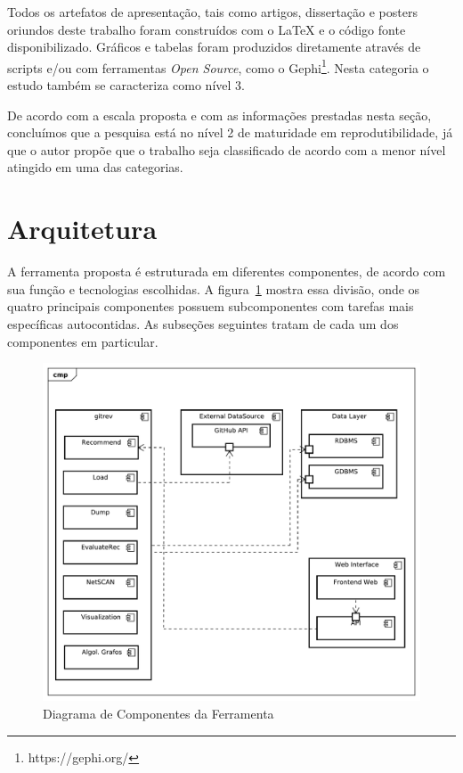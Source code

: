 \documentclass[12pt,openany,oneside,a4paper,english,brazil]{abntbibufjf}
\begin{document}
    Todos os artefatos de apresentação, tais como artigos, dissertação e posters oriundos deste trabalho foram construídos com o \LaTeX \cite{lamport1994} e o código fonte disponibilizado. Gráficos e tabelas foram produzidos diretamente através de scripts e/ou com ferramentas \textit{Open Source}, como o Gephi\footnote{https://gephi.org/}. Nesta categoria o estudo também se caracteriza como nível 3.

    De acordo com a escala proposta \cite{sinha2016} e com as informações prestadas nesta seção, concluímos que a pesquisa está no nível 2 de maturidade em reprodutibilidade, já que o autor propõe que o trabalho seja classificado de acordo com a menor nível atingido em uma das categorias.

    \section{Arquitetura}\label{sec:arquitetura}

		A ferramenta proposta é estruturada em diferentes componentes, de acordo com sua função e tecnologias escolhidas. A figura~\ref{fig:componentes} mostra essa divisão, onde os quatro principais componentes possuem subcomponentes com tarefas mais específicas autocontidas. As subseções seguintes tratam de cada um dos componentes em particular.


    \begin{figure}[!htbp]
        \centering
        \includegraphics[width=.8\textwidth]{componentes}
        \caption{Diagrama de Componentes da Ferramenta}\label{fig:componentes}
    \end{figure}
\end{document}

